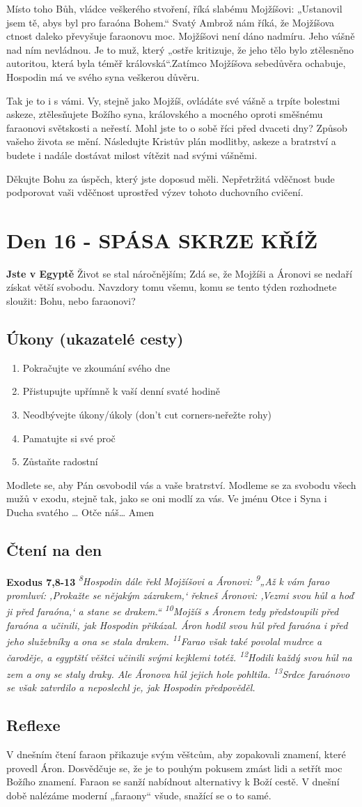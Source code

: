 \documentclass[11pt]{article}
\newcommand{\zacatekTretiTyden}{
  \textbf{Jste v Egyptě} \newline
  Život se stal náročnějším; Zdá se, že Mojžíši a Áronovi se nedaří získat větší svobodu. Navzdory tomu všemu,
komu se tento týden rozhodnete sloužit: Bohu, nebo faraonovi?

\subsection*{Úkony (ukazatelé cesty)}
\begin{enumerate}
  \item Pokračujte ve zkoumání svého dne
  \item Přistupujte upřímně k vaší denní svaté hodině
  \item Neodbývejte úkony/úkoly (don’t cut corners-neřežte rohy)
  \item Pamatujte si své proč
  \item Zůstaňte radostní
\end{enumerate}
Modlete se, aby Pán osvobodil vás a vaše bratrství. \newline
Modleme se za svobodu všech mužů v exodu, stejně tak, jako se oni modlí za vás.\newline
Ve jménu Otce i Syna i Ducha svatého …  Otče náš… Amen
}
\begin{document}
Místo toho Bůh, vládce veškerého stvoření, říká slabému Mojžíšovi: „Ustanovil jsem tě, abys byl pro faraóna
Bohem.“ Svatý Ambrož nám říká, že Mojžíšova ctnost daleko převyšuje faraonovu moc. Mojžíšovi není dáno
nadmíru. Jeho vášně nad ním nevládnou. Je to muž, který „ostře kritizuje, že jeho tělo bylo ztělesněno autoritou,
která byla téměř královská“.Zatímco Mojžíšova sebedůvěra ochabuje, Hospodin má ve svého syna veškerou
důvěru.

Tak je to i s vámi. Vy, stejně jako Mojžíš, ovládáte své vášně a trpíte bolestmi askeze, ztělesňujete Božího syna,
královského a mocného oproti směšnému faraonovi světskosti a neřestí. Mohl jste to o sobě říci před dvaceti dny?
Způsob vašeho života se mění. Následujte Kristův plán modlitby, askeze a bratrství a budete i nadále dostávat
milost vítězit nad svými vášněmi.

Děkujte Bohu za úspěch, který jste doposud měli. Nepřetržitá vděčnost bude podporovat vaši vděčnost uprostřed
výzev tohoto duchovního cvičení.

\newpage
\section{Den 16 - SPÁSA SKRZE KŘÍŽ}
\zacatekTretiTyden
\subsection*{Čtení na den}
\textbf{Exodus 7,8-13}
\newline
\textit{
\textsuperscript{8}Hospodin dále řekl Mojžíšovi a Áronovi:
\textsuperscript{9}„Až k vám farao promluví: ‚Prokažte se nějakým zázrakem,‘ řekneš Áronovi: ‚Vezmi svou hůl a hoď ji před faraóna,‘ a stane se drakem.“
\textsuperscript{10}Mojžíš s Áronem tedy předstoupili před faraóna a učinili, jak Hospodin přikázal. Áron hodil svou hůl před faraóna i před jeho služebníky a ona se stala drakem.
\textsuperscript{11}Farao však také povolal mudrce a čaroděje, a egyptští věštci učinili svými kejklemi totéž.
\textsuperscript{12}Hodili každý svou hůl na zem a ony se staly draky. Ale Áronova hůl jejich hole pohltila.
\textsuperscript{13}Srdce faraónovo se však zatvrdilo a neposlechl je, jak Hospodin předpověděl.
}

\subsection*{Reflexe}

V dnešním čtení faraon přikazuje svým věštcům, aby zopakovali znamení, které provedl Áron.
Dosvědčuje se, že je to pouhým pokusem zmást lidi a setřít moc Božího znamení. Faraon se sanží
nabídnout alternativy k Boží cestě. V dnešní době nalézáme moderní „faraony“ všude, snažící se o to
samé.
\end{document}
